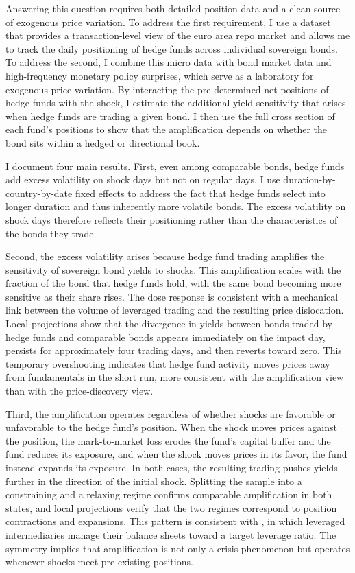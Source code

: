 \documentclass[english, 11pt, oneside]{article}
\begin{document}
Answering this question requires both detailed position data and a clean source of exogenous price variation. To address the first requirement, I use a dataset that provides a transaction-level view of the euro area repo market and allows me to track the daily positioning of hedge funds across individual sovereign bonds. To address the second, I combine this micro data with bond market data and high-frequency monetary policy surprises, which serve as a laboratory for exogenous price variation. By interacting the pre-determined net positions of hedge funds with the shock, I estimate the additional yield sensitivity that arises when hedge funds are trading a given bond. I then use the full cross section of each fund's positions to show that the amplification depends on whether the bond sits within a hedged or directional book.

I document four main results. First, even among comparable bonds, hedge funds add excess volatility on shock days but not on regular days. I use duration-by-country-by-date fixed effects to address the fact that hedge funds select into longer duration and thus inherently more volatile bonds. The excess volatility on shock days therefore reflects their positioning rather than the characteristics of the bonds they trade.

Second, the excess volatility arises because hedge fund trading amplifies the sensitivity of sovereign bond yields to shocks. This amplification scales with the fraction of the bond that hedge funds hold, with the same bond becoming more sensitive as their share rises. The dose response is consistent with a mechanical link between the volume of leveraged trading and the resulting price dislocation. Local projections show that the divergence in yields between bonds traded by hedge funds and comparable bonds appears immediately on the impact day, persists for approximately four trading days, and then reverts toward zero. This temporary overshooting indicates that hedge fund activity moves prices away from fundamentals in the short run, more consistent with the amplification view than with the price-discovery view.

Third, the amplification operates regardless of whether shocks are favorable or unfavorable to the hedge fund's position. When the shock moves prices against the position, the mark-to-market loss erodes the fund's capital buffer and the fund reduces its exposure, and when the shock moves prices in its favor, the fund instead expands its exposure. In both cases, the resulting trading pushes yields further in the direction of the initial shock. Splitting the sample into a constraining and a relaxing regime confirms comparable amplification in both states, and local projections verify that the two regimes correspond to position contractions and expansions. This pattern is consistent with \citet{adrian2014}, in which leveraged intermediaries manage their balance sheets toward a target leverage ratio. The symmetry implies that amplification is not only a crisis phenomenon but operates whenever shocks meet pre-existing positions.
\end{document}
